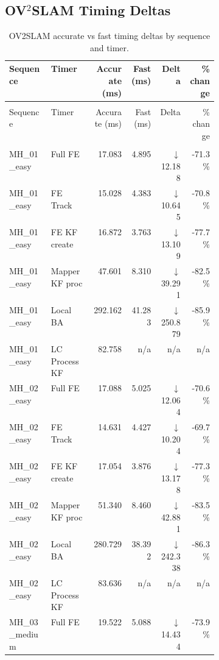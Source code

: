 \documentclass[11pt]{article}
\begin{document}
\subsection{OV$^{2}$SLAM Timing Deltas}

\begingroup
\small
\setlength{\LTleft}{0pt}
\setlength{\LTright}{0pt}
\setlength{\tabcolsep}{4pt}
\begin{longtable}{@{}>{\raggedright\arraybackslash}p{0.20\linewidth}>{\raggedright\arraybackslash}p{0.20\linewidth}rrrr@{}}
\caption{OV2SLAM accurate vs fast timing deltas by sequence and timer.\label{tab:ov2_timing_deltas}} \\
\toprule
Sequence & Timer & Accurate (ms) & Fast (ms) & Delta & \% change \\
\midrule
\endfirsthead
\multicolumn{6}{c}{\tablename\ \thetable\ continued from previous page} \\
\toprule
Sequence & Timer & Accurate (ms) & Fast (ms) & Delta & \% change \\
\midrule
\endhead
\midrule
\multicolumn{6}{r@{}}{\footnotesize Continued on next page} \\
\endfoot
\bottomrule
\endlastfoot
MH\_01\_easy & Full FE & 17.083 & 4.895 & $\downarrow$ 12.188 & -71.3\% \\
MH\_01\_easy & FE Track & 15.028 & 4.383 & $\downarrow$ 10.645 & -70.8\% \\
MH\_01\_easy & FE KF create & 16.872 & 3.763 & $\downarrow$ 13.109 & -77.7\% \\
MH\_01\_easy & Mapper KF proc & 47.601 & 8.310 & $\downarrow$ 39.291 & -82.5\% \\
MH\_01\_easy & Local BA & 292.162 & 41.283 & $\downarrow$ 250.879 & -85.9\% \\
MH\_01\_easy & LC ProcessKF & 82.758 & n/a & n/a & n/a \\
MH\_02\_easy & Full FE & 17.088 & 5.025 & $\downarrow$ 12.064 & -70.6\% \\
MH\_02\_easy & FE Track & 14.631 & 4.427 & $\downarrow$ 10.204 & -69.7\% \\
MH\_02\_easy & FE KF create & 17.054 & 3.876 & $\downarrow$ 13.178 & -77.3\% \\
MH\_02\_easy & Mapper KF proc & 51.340 & 8.460 & $\downarrow$ 42.881 & -83.5\% \\
MH\_02\_easy & Local BA & 280.729 & 38.392 & $\downarrow$ 242.338 & -86.3\% \\
MH\_02\_easy & LC ProcessKF & 83.636 & n/a & n/a & n/a \\
MH\_03\_medium & Full FE & 19.522 & 5.088 & $\downarrow$ 14.434 & -73.9\% \\

\end{longtable}
\end{document}
